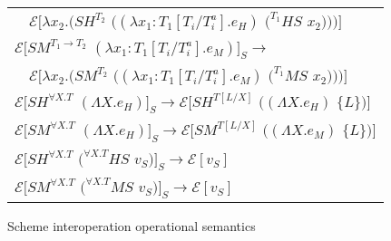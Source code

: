 \begin{figure}[p]
\begin{tabular}{l}
\vspace{5pt}

$\quad\mathscr{E}[\lambda x_{2}.(SH^{T_{2}}$ $((\lambda x_{1}:T_{1}[T_{i}/T_{i}^{a}].e_{H})$ $(^{T_{1}}HS$ $x_{2})))]$ \\

\vspace{5pt}

$\mathscr{E}[SM^{T_{1}\rightarrow T_{2}}$ $(\lambda x_{1}:T_{1}[T_{i}/T_{i}^{a}].e_{M})]_{S}\rightarrow$ \\

\vspace{5pt}

$\quad\mathscr{E}[\lambda x_{2}.(SM^{T_{2}}$ $((\lambda x_{1}:T_{1}[T_{i}/T_{i}^{a}].e_{M})$ $(^{T_{1}}MS$ $x_{2})))]$ \\

\vspace{5pt}

$\mathscr{E}[SH^{\forall X.T}$ $(\Lambda X.e_{H})]_{S}\rightarrow\mathscr{E}[SH^{T[L/X]}$ $((\Lambda X.e_{H})$ $\lbrace L\rbrace)]$ \\

\vspace{5pt}

$\mathscr{E}[SM^{\forall X.T}$ $(\Lambda X.e_{H})]_{S}\rightarrow\mathscr{E}[SM^{T[L/X]}$ $((\Lambda X.e_{M})$ $\lbrace L\rbrace)]$ \\

\vspace{5pt}

$\mathscr{E}[SH^{\forall X.T}$ $(^{\forall X.T}HS$ $v_{S})]_{S}\rightarrow\mathscr{E}[v_{S}]$ \\

\vspace{5pt}

$\mathscr{E}[SM^{\forall X.T}$ $(^{\forall X.T}MS$ $v_{S})]_{S}\rightarrow\mathscr{E}[v_{S}]$
\end{tabular}
\caption{Scheme interoperation operational semantics}
\label{isos}
\end{figure}